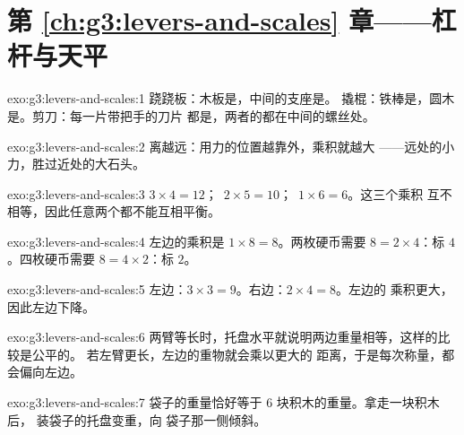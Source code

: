 \section*{第 \ref{ch:g3:levers-and-scales} 章——杠杆与天平}

\begin{solution}{exo:g3:levers-and-scales:1}
跷跷板：木板是，中间的支座是。
撬棍：铁棒是，圆木是。剪刀：每一片带把手的刀片
都是，两者的都在中间的螺丝处。
\end{solution}

\begin{solution}{exo:g3:levers-and-scales:2}
离越远：用力的位置越靠外，乘积就越大
——远处的小力，胜过近处的大石头。
\end{solution}

\begin{solution}{exo:g3:levers-and-scales:3}
$3 \times 4 = 12$；\ $2 \times 5 = 10$；\ $1 \times 6 = 6$。这三个乘积
互不相等，因此任意两个都不能互相平衡。
\end{solution}

\begin{solution}{exo:g3:levers-and-scales:4}
左边的乘积是 $1 \times 8 = 8$。两枚硬币需要 $8 = 2 \times
4$：标 $4$。四枚硬币需要 $8 = 4 \times 2$：标 $2$。
\end{solution}

\begin{solution}{exo:g3:levers-and-scales:5}
左边：$3 \times 3 = 9$。右边：$2 \times 4 = 8$。左边的
乘积更大，因此左边下降。
\end{solution}

\begin{solution}{exo:g3:levers-and-scales:6}
两臂等长时，托盘水平就说明两边重量相等，这样的比较是公平的。
若左臂更长，左边的重物就会乘以更大的
距离，于是每次称量，都
会偏向左边。
\end{solution}

\begin{solution}{exo:g3:levers-and-scales:7}
袋子的重量恰好等于 $6$ 块积木的重量。拿走一块积木后，
装袋子的托盘变重，向
袋子那一侧倾斜。
\end{solution}

